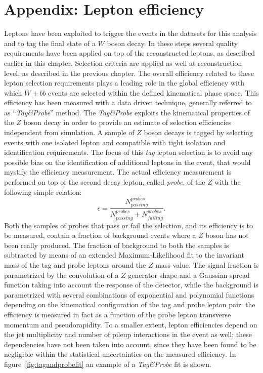 \section{Appendix: Lepton efficiency}
\label{sec:tagandprobe}

Leptons have been exploited to trigger the events in the datasets
for this analysis
and to tag the final state of a $W$ boson decay.
In these steps several quality requirements have been applied on
top of the reconstructed leptons,
as described earlier in this chapter.
Selection criteria are applied as well at reconstruction level,
as described in the previous chapter.
The overall efficiency related to these lepton selection requirements plays a
leading role in the global efficiency with which $W + bb$ events are
selected within the defined kinematical phase space.
This efficiency has been measured with a data driven technique,
generally referred to as ``\textit{Tag\&Probe}'' method.
The \textit{Tag\&Probe} exploits the kinematical properties of the
$Z$ boson decay in order to provide an estimate of selection efficiencies
independent from simulation. A sample of $Z$ boson decays is tagged by selecting
events with one isolated lepton and compatible with tight isolation and
identification requirements. The focus of this \textit{tag} lepton selection
is to avoid any possible bias on the identification of additional
leptons in the event, that would mystify the efficiency measurement.
The actual efficiency measurement is performed on top of the second decay lepton,
called \textit{probe},
of the $Z$ with the following simple relation:
$$ \epsilon = \frac{ N_{passing}^{probes}}{N_{passing}^{probes} + N_{failing}^{probes} } \mathrm{.}$$
Both the samples of probes that pass or fail the selection, and its efficiency
is to be measured, contain a fraction of background events where a $Z$ boson has not
been really produced. The fraction of background to both the samples is subtracted
by means of an extended Maximum-Likelihood fit to the invariant mass
of the tag and probe leptons around the $Z$ mass value.
The signal fraction is parametrized by the convolution of
a $Z$ generator shape and a Gaussian spread function taking into account
the response of the detector, while the background is parametrized with several combinations
of exponential and polynomial functions depending on the kinematical configuration of the
tag and probe lepton pair: the efficiency is measured in fact  as a function of the
probe lepton transverse momentum and pseudorapidity. To a smaller extent,
lepton efficiencies depend on the jet multiplicity and number of pileup interactions
in the event as well; these dependencies have not been taken into account, since they
have been found to be negligible within the
statistical uncertainties on the measured efficiency.
In figure~\ref{fig:tagandprobefit} an example of a \textit{Tag\&Probe} fit
is shown.

